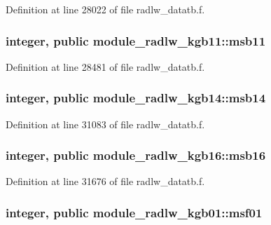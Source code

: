 Definition at line 28022 of file radlw\+\_\+datatb.\+f.

\subsubsection[{\texorpdfstring{msb11}{msb11}}]{\setlength{\rightskip}{0pt plus 5cm}integer, public module\+\_\+radlw\+\_\+kgb11\+::msb11}\hypertarget{group__module__radlw__main_gaa8630868015cb7e358107e6418e35276}{}\label{group__module__radlw__main_gaa8630868015cb7e358107e6418e35276}


Definition at line 28481 of file radlw\+\_\+datatb.\+f.

\subsubsection[{\texorpdfstring{msb14}{msb14}}]{\setlength{\rightskip}{0pt plus 5cm}integer, public module\+\_\+radlw\+\_\+kgb14\+::msb14}\hypertarget{group__module__radlw__main_ga2d400a2aa969f2b2b6efd15555b67159}{}\label{group__module__radlw__main_ga2d400a2aa969f2b2b6efd15555b67159}


Definition at line 31083 of file radlw\+\_\+datatb.\+f.

\subsubsection[{\texorpdfstring{msb16}{msb16}}]{\setlength{\rightskip}{0pt plus 5cm}integer, public module\+\_\+radlw\+\_\+kgb16\+::msb16}\hypertarget{group__module__radlw__main_ga18ad5b461d6c71b1aa2d82d5694beb03}{}\label{group__module__radlw__main_ga18ad5b461d6c71b1aa2d82d5694beb03}


Definition at line 31676 of file radlw\+\_\+datatb.\+f.

\subsubsection[{\texorpdfstring{msf01}{msf01}}]{\setlength{\rightskip}{0pt plus 5cm}integer, public module\+\_\+radlw\+\_\+kgb01\+::msf01}\hypertarget{group__module__radlw__main_ga321c2e84e14d28142d08bb5fbe485a67}{}\label{group__module__radlw__main_ga321c2e84e14d28142d08bb5fbe485a67}


